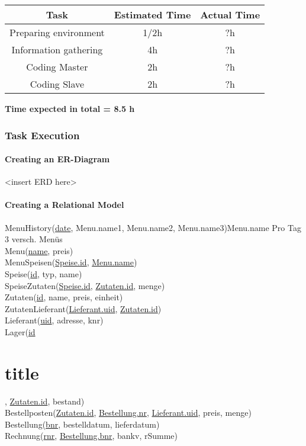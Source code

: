 \documentclass[11pt,a4paper]{article}
\begin{document}
\begin{table}[h]
\begin{tabular}{@{}|c|c|c|@{}}
\toprule
\textbf{Task}         & \textbf{Estimated Time} & \textbf{Actual Time} \\ \midrule
Preparing environment & 1/2h                    & ?h                   \\ \midrule
Information gathering & 4h                      & ?h                   \\ \midrule
Coding Master         & 2h                      & ?h                   \\ \midrule
Coding Slave          & 2h                      & ?h                   \\ \bottomrule
\end{tabular}
\end{table}

\bf Time expected in total = 8.5 h

\newpage

\section{Task Execution}
\subsection{Creating an ER-Diagram}
<insert ERD here>

\subsection{Creating a Relational Model}
MenuHistory(\underline{date}, Menu.name1, Menu.name2, Menu.name3)Menu.name Pro Tag 3 versch. Menüs \\
Menu(\underline{name}, preis) \\
MenuSpeisen(\underline{Speise.id}, \underline{Menu.name}) \\
Speise(\underline{id}, typ, name) \\
SpeiseZutaten(\underline{Speise.id}, \underline{Zutaten.id}, menge) \\
Zutaten(\underline{id}, name, preis, einheit) \\
ZutatenLieferant(\underline{Lieferant.uid}, \underline{Zutaten.id}) \\
Lieferant(\underline{uid}, adresse, knr) \\
Lager(\underline{id}\part{title}, \underline{Zutaten.id}, bestand) \\
Bestellposten(\underline{Zutaten.id}, \underline{Bestellung.nr}, \underline{Lieferant.uid}, preis, menge) \\
Bestellung(\underline{bnr}, bestelldatum, lieferdatum) \\
Rechnung(\underline{rnr}, \underline{Bestellung.bnr}, bankv, rSumme) \\
\end{document}

